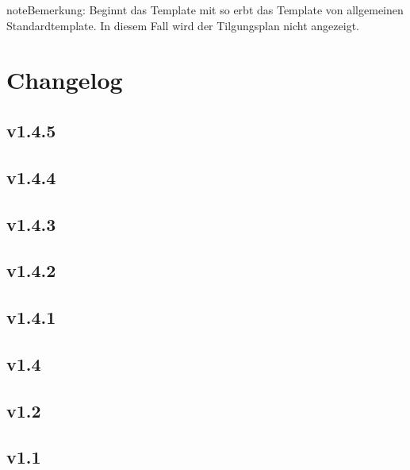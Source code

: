 \documentclass[a4paper,10pt,openany,oneside,ngerman]{sphinxmanual}
\begin{document}
\begin{sphinxadmonition}{note}{Bemerkung:}
Beginnt das Template mit  so erbt das Template von allgemeinen Standardtemplate. In diesem Fall wird der Tilgungsplan nicht angezeigt.
\end{sphinxadmonition}


\chapter{Changelog}
\label{\detokenize{changelog:changelog}}\label{\detokenize{changelog::doc}}

\section{v1.4.5}
\label{\detokenize{changelog:v1-4-5}}

\section{v1.4.4}
\label{\detokenize{changelog:v1-4-4}}

\section{v1.4.3}
\label{\detokenize{changelog:v1-4-3}}

\section{v1.4.2}
\label{\detokenize{changelog:v1-4-2}}

\section{v1.4.1}
\label{\detokenize{changelog:v1-4-1}}

\section{v1.4}
\label{\detokenize{changelog:v1-4}}

\section{v1.2}
\label{\detokenize{changelog:v1-2}}

\section{v1.1}
\label{\detokenize{changelog:v1-1}}


\renewcommand{\indexname}{Stichwortverzeichnis}
\footnotesize\raggedright\printindex
\end{document}
